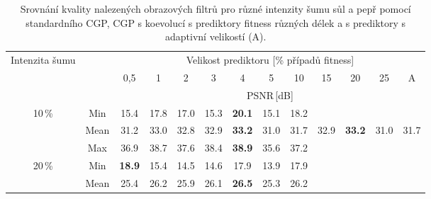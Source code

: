 \documentclass[fleqn,11pt]{ExcelAtFIT} %
\begin{document}
\begin{table}[t!]
\centering
    \caption{Srovnání kvality nalezených obrazových filtrů pro různé intenzity šumu sůl a pepř pomocí standardního CGP, CGP s koevolucí s prediktory fitness různých délek a s prediktory s adaptivní velikostí (A).}
    \label{table:quality}


    \renewcommand{\arraystretch}{1.1}
    \small
    \color{fixme}
    \begin{tabular}{| c | c | c| c | c | c | c | c | c | c | c | c | c |}
            \hline

                \multirow{3}{1.6cm}{\centering{}Intenzita šumu} & \multirow{3}{*}{} & \multicolumn{11}{c|}{Velikost prediktoru [\% případů fitness]}\\
                \cline{3-13}
                && 0,5 & 1 & 2 & 3 & 4 & 5 & 10 & 15 & 20 & 25 & A \\
                \cline{3-13}
                &&\multicolumn{11}{c|}{PSNR\,[dB]}\\

            \hline\hline



         \multirow{3}{*}{10\,\%}&\textcolor{grayintable}{Min}& \textcolor{grayintable}{15.4} & \textcolor{grayintable}{17.8}  & \textcolor{grayintable}{17.0}
         & \textcolor{grayintable}{15.3} & {\bf \textcolor{grayintable}{20.1}} & \textcolor{grayintable}{15.1}& \textcolor{grayintable}{18.2}\\ %

         &Mean& 31.2 & 33.0  & 32.8
         & 32.9 & {\bf 33.2} & 31.0 & 31.7 & 32.9 & {\bf 33.2} & 31.0 & 31.7\\ %

         &\textcolor{grayintable}{Max}& \textcolor{grayintable}{36.9} & \textcolor{grayintable}{38.7}  & \textcolor{grayintable}{37.6}
         & \textcolor{grayintable}{38.4} & \textcolor{grayintable}{{\bf 38.9}} & \textcolor{grayintable}{35.6}& \textcolor{grayintable}{37.2}\\ \hline \hline

         \multirow{3}{*}{20\,\%}&\textcolor{grayintable}{Min}& \textcolor{grayintable}{{\bf 18.9}} & \textcolor{grayintable}{15.4}
         & \textcolor{grayintable}{14.5} & \textcolor{grayintable}{14.6} & \textcolor{grayintable}{17.9} & \textcolor{grayintable}{13.9}& \textcolor{grayintable}{17.9} \\ %

         &Mean& 25.4 & 26.2  & 25.9
         & 26.1 & {\bf 26.5}& 25.3& 26.2 \\ %


\end{tabular}
\end{table}
\end{document}
